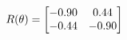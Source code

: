 \documentclass[preview]{standalone}
\begin{document}
\begin{align*}
\special{dvisvgm:raw <g id='unique000'>}R(\theta) = \begin{bmatrix}-0.90 & 0.44\\-0.44 & -0.90\end{bmatrix}\special{dvisvgm:raw </g>}
\end{align*}
\end{document}

